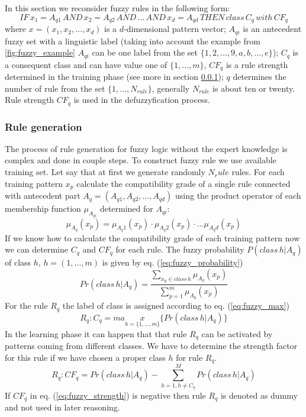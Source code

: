 In this section we reconsider fuzzy rules in the following form:
$$IF\, x_1=A_{q1}\, AND\, x_2=A_{q2}\, AND\, \ldots\, AND\, x_d=A_{qd}\, THEN\,
class\, C_q\, with \, CF_q$$
where $x=(x_1, x_2, \ldots, x_d)$ is a $d$-dimensional pattern vector; $A_{qi}$
is an antecedent fuzzy set with a linguistic label (taking into account the
example from \ref{fig:fuzzy_example} $A_{qi}$ can be one label from the set
$\{1, 2, \ldots, 9, a, b, \ldots, e \}$); $C_q$ is a consequent class and can
have value one of $\{1, \ldots, m\}$, $CF_q$ is a rule strength determined in the
training phase (see more in section \ref{cha:Fuzzy_logic_rule_generation}); $q$
determines the number of rule from the set $\{1, \ldots, N_{rule}\}$, generally
$N_{rule}$ is about ten or twenty. Rule strength $CF_q$ is used in the
defuzzyfication process.
\subsubsection{Rule generation}
\label{cha:Fuzzy_logic_rule_generation}
The process of rule generation for fuzzy logic without the expert knowledge is
complex and done in couple steps. To construct fuzzy rule we use available
training set. Let say that at first we generate randomly $N_rule$ rules. For
each training pattern $x_p$ calculate the compatibility grade of a single rule
connected with antecedent part $A_q = (A_{q1}, A_{q2}, \ldots, A_{qd})$ using
the product operator of each membership function $\mu_{A_{qi}}$ determined for
$A_{qi}$:
\begin{equation}
    \mu_{A_q}(x_p)=\mu_{A_q1}(x_p)\cdot\mu_{A_q2}(x_p)\cdot\ldots\mu_{A_qd}(x_p)
    \label{eq:mu_product}
\end{equation}
If we know how to calculate the compatibility grade of each training pattern
now we can determine $C_q$ and $CF_q$ for each rule. The fuzzy probability
$P(class\, h|A_q)$ of class $h$, $h=(1, \ldots, m)$ is given by eq. (\ref{eq:fuzzy_probability})
\begin{equation}
    Pr(class \, h|A_q) = \frac{\sum\limits_{x_p \in class\,
    h}\mu_{A_q}(x_p)}{\sum\limits_{p=1}^m\mu_{A_q}(x_p)}
    \label{eq:fuzzy_probability}
\end{equation}
For the rule $R_q$ the label of class is assigned according to eq.
(\ref{eq:fuzzy_max})
\begin{equation}
    R_q: C_q = max\limits_{h=\{1, \ldots, m\}}\{Pr(class\,h|A_q)\}
    \label{eq:fuzzy_max}
\end{equation}
In the learning phase it can happen that that rule $R_q$ can be activated by
patterns coming from different classes. We have to determine the strength
factor for this rule if we have chosen a proper class $h$ for rule $R_q$. 
\begin{equation}
    R_q: CF_q=Pr(class\, h|A_q) - \sum\limits_{h=1, h\neq C_q}^MPr(class\,h|A_q)
    \label{eq:fuzzy_strength}
\end{equation}
If $CF_q$ in eq. (\ref{eq:fuzzy_strength}) is negative then rule $R_q$ is
denoted as dummy and not used in later reasoning.
